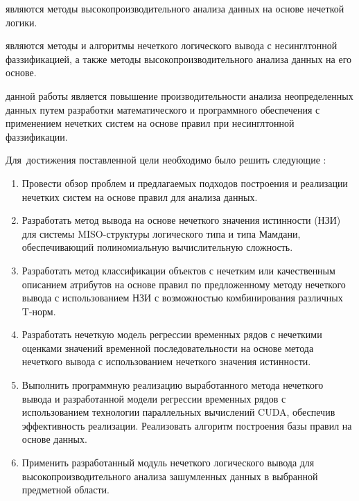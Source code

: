 \ifsynopsis
\else
\fi


{\researchObject} являются методы высокопроизводительного анализа данных на основе нечеткой логики.

{\researchSubject} являются методы и алгоритмы нечеткого логического вывода с несинглтонной фаззификацией, а также методы высокопроизводительного анализа данных на его основе.

{\aim} данной работы является повышение производительности анализа неопределенных данных путем разработки математического и программного обеспечения с применением нечетких систем на основе правил при несинглтонной фаззификации.

Для~достижения поставленной цели необходимо было решить следующие {\tasks}:
\begin{enumerate}[beginpenalty=10000] %
  \item Провести обзор проблем и предлагаемых подходов построения и реализации нечетких систем на основе правил для анализа данных.
  \item Разработать метод вывода на основе нечеткого значения истинности (НЗИ) для системы MISO-структуры логического типа и типа Мамдани, обеспечивающий полиномиальную вычислительную сложность.
  \item Разработать метод классификации объектов с нечетким или качественным описанием атрибутов на основе правил по предложенному методу нечеткого вывода с использованием НЗИ с возможностью комбинирования различных T-норм.
  \item Разработать нечеткую модель регрессии временных рядов с нечеткими оценками значений временной последовательности на основе метода нечеткого вывода с использованием нечеткого значения истинности.
  \item Выполнить программную реализацию выработанного метода нечеткого вывода и разработанной модели регрессии временных рядов с использованием технологии параллельных вычислений CUDA, обеспечив эффективность реализации. Реализовать алгоритм построения базы правил на основе данных.
  \item Применить разработанный модуль нечеткого логического вывода для высокопроизводительного анализа зашумленных данных в выбранной предметной области.
\end{enumerate}

